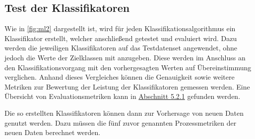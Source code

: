\subsection*{Test der Klassifikatoren}

Wie in \autoref{fig:ml2} dargestellt ist, wird für jeden Klassifikationsalgorithmus ein Klassifikator erstellt, welcher anschließend getestet und evaluiert wird. Dazu werden die jeweiligen Klassifikatoren auf das Testdatenset angewendet, ohne jedoch die Werte der Zielklassen mit anzugeben. Diese werden im Anschluss an den Klassifikationsvorgang mit den vorhergesagten Werten auf Übereinstimmung verglichen. Anhand dieses Vergleiches können die Genauigkeit sowie weitere Metriken zur Bewertung der Leistung der Klassifikatoren gemessen werden. Eine Übersicht von Evaluationsmetriken kann in \hyperref[eval-metrics]{Abschnitt 5.2.1} gefunden werden.

Die so erstellten Klassifikatoren können dann zur Vorhersage von neuen Daten genutzt werden. Dazu müssen die fünf zuvor genannten Prozessmetriken der neuen Daten berechnet werden. 

\cleardoublepage
